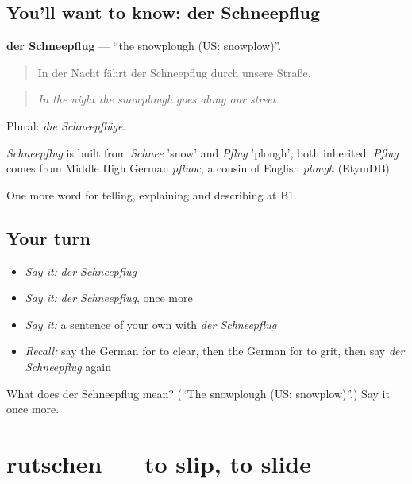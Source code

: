 \subsection*{You'll want to know: der Schneepflug}
\textbf{der Schneepflug} — \textquotedblleft{}the snowplough (US: snowplow)\textquotedblright{}.

\begin{quote}
In der Nacht fährt der Schneepflug durch unsere Straße.
\end{quote}

\begin{quote}
\emph{In the night the snowplough goes along our street.}
\end{quote}

Plural: \emph{die Schneepflüge}.

\begin{cousinweb}
\emph{Schneepflug} is built from \emph{Schnee} 'snow' and \emph{Pflug} 'plough', both inherited: \emph{Pflug} comes from Middle High German \emph{pfluoc}, a cousin of English \emph{plough} (EtymDB).
\end{cousinweb}

\begin{grammarlens}[title={What you've built}]
One more word for telling, explaining and describing at B1.
\end{grammarlens}

\subsection*{Your turn}
\begin{itemize}
\raggedright
  \item \emph{Say it:} \emph{der Schneepflug}
  \item \emph{Say it:} \emph{der Schneepflug}, once more
  \item \emph{Say it:} a sentence of your own with \emph{der Schneepflug}
  \item \emph{Recall:} say the German for to clear, then the German for to grit, then say \emph{der Schneepflug} again
\end{itemize}

\begin{tcolorbox}[breakable,colback=teal!4,colframe=teal!35!black,title={Before you move on}]
What does der Schneepflug mean? (\textquotedblleft{}The snowplough (US: snowplow)\textquotedblright{}.) Say it once more.
\end{tcolorbox}
\section[rutschen]{rutschen — to slip, to slide}

